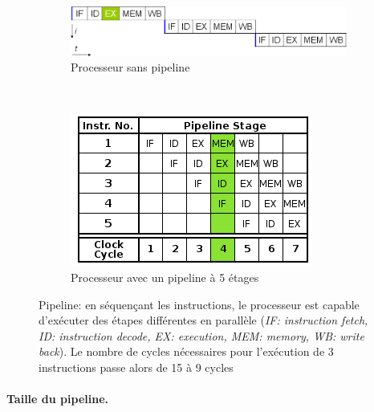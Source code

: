             
            \begin{figure}
                \begin{subfigure}[]{0.5\linewidth}\centering
                    \vspace{1.6cm}
                    \includegraphics[width=\linewidth]{images/Chapitre1/pipelineNo.png}
                    \caption{Processeur sans pipeline \label{pic_pip_no}}
                \end{subfigure}%
                ~ %
                \begin{subfigure}[]{0.5\linewidth}\centering
                    \includegraphics[width=.7\linewidth]{images/Chapitre1/pipelineYes.png}
                    \caption{Processeur avec un pipeline à 5 étages \label{pic_pip_yes}}
                \end{subfigure}
                
                \caption{Pipeline\protect\footnotemark: en séquençant les instructions, le processeur est capable d'exécuter des étapes différentes en parallèle (\textit{IF: instruction fetch, ID: instruction decode, EX: execution, MEM: memory, WB: write back}). Le nombre de cycles nécessaires pour l'exécution de 3 instructions passe alors de 15 à 9 cycles}
                \label{pic_pipeline}
            \end{figure}
            
            
        
        
        \paragraph{Taille du pipeline.}
        
